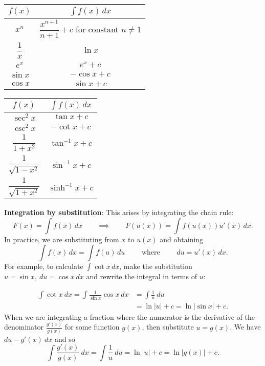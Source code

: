 \documentclass[10pt, a4paper]{article}
\begin{document}
\begin{minipage}{0.55\textwidth}
\centering
\bgroup
\def\setlength{25pt}
\def\arraystretch{2}
\begin{tabular}{|c|c|}
    \hline
    $f(x)$ & $\displaystyle\int f(x)\,dx$ \\
    \hline
    $x ^ n$ & $\dfrac{x ^ {n + 1}}{n + 1} + c$ for constant $n \neq 1$ \\
    \hline
    $\dfrac{1}{x}$ & $\ln{x}$ \\
    \hline
    $e ^ x$ & $e ^ x + c$ \\
    \hline
    $\sin{x}$ & $-\cos{x} + c$ \\
    \hline
    $\cos{x}$ & $\sin{x} + c$ \\
    \hline
\end{tabular}
\egroup
\end{minipage}
\begin{minipage}{0.55\textwidth}
\centering
\bgroup
\def\setlength{25pt}
\def\arraystretch{2}
\begin{tabular}{|c|c|}
    \hline
    $f(x)$ & $\displaystyle\int f(x)\,dx$ \\
    \hline
    $\sec ^ 2 x$ & $\tan x + c$ \\
    \hline
    $\csc ^ 2 x$ & $-\cot x + c$ \\
    \hline
    $\dfrac{1}{1 + x ^ 2}$ & $\tan ^ {-1} x + c$ \\
    \hline
    $\dfrac{1}{\sqrt{1 - x ^ 2}}$ & $\sin ^ {-1} x + c$ \\
    \hline
    $\dfrac{1}{\sqrt{1 + x ^ 2}}$ & $\sinh ^ {-1} x + c$ \\
    \hline
\end{tabular}
\egroup
\end{minipage}

\textbf{Integration by substitution}: This arises by integrating the chain rule:
\[
F(x) = \int f(x)\,dx\qquad\implies\qquad F(u(x)) = \int f(u(x))u'(x)\,dx.
\]
In practice, we are substituting from $x$ to $u(x)$ and obtaining
\[
\int f(x)\,dx = \int f(u)\,du\qquad\text{ where }\qquad du = u'(x)\,dx.
\]
For example, to calculate $\int \cot x \, dx$, make the substitution $u = \sin x,\ du = \cos x\ dx$ and rewrite the integral in terms of $u$:

\begin{align*}
\int\cot x\ dx = \int \frac{1}{\sin x}\cos x\ dx &= \int \frac{1}{u}\ du \\
&= \ln |u| + c = \ln |\sin x| + c.
\end{align*}
When we are integrating a fraction where the numerator is the derivative of the denominator $\frac{g'(x)}{g(x)}$ for some function $g(x)$, then substitute $u = g(x)$. We have $du - g'(x)\ dx$ and so
\[
\int \frac{g'(x)}{g(x)}\ dx = \int \frac{1}{u}\ du = \ln |u| + c = \ln |g(x)| + c.
\]
\end{document}
